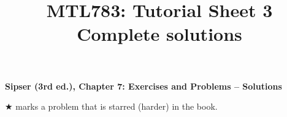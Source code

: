 \documentclass[11pt,a4paper]{article}
\title{\textbf{MTL783: Tutorial Sheet 3}\\[0.3em]\large Complete solutions}
\date{}
\begin{document}
{\centering\Large\bfseries Sipser (3rd ed.), Chapter 7: Exercises and Problems -- Solutions\par}
{\centering\small $\bigstar$ marks a problem that is starred (harder) in the book.\par}




\end{document}
